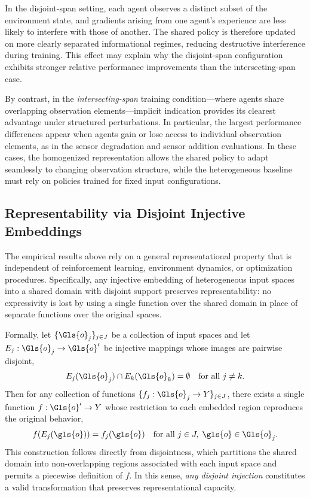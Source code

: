 In the disjoint-span setting, each agent observes a distinct subset of the
environment state, and gradients arising from one agent's experience are less
likely to interfere with those of another. The shared policy is therefore
updated on more clearly separated informational regimes, reducing destructive
interference during training. This effect may explain why the disjoint-span
configuration exhibits stronger relative performance improvements than the
intersecting-span case.

By contrast, in the \emph{intersecting-span} training condition—where agents share
overlapping observation elements—implicit indication provides its clearest advantage
under structured perturbations. In particular, the largest performance differences
appear when agents gain or lose access to individual observation elements, as in the
sensor degradation and sensor addition evaluations. In these cases, the homogenized
representation allows the shared policy to adapt seamlessly to changing observation
structure, while the heterogeneous baseline must rely on policies trained for fixed
input configurations.

\subsection{Representability via Disjoint Injective Embeddings}


The empirical results above rely on a general representational property that is
independent of reinforcement learning, environment dynamics, or optimization
procedures. Specifically, any injective embedding of heterogeneous input spaces
into a shared domain with disjoint support preserves representability: no
expressivity is lost by using a single function over the shared domain in place of
separate functions over the original spaces.

Formally, let \(\{\Gls{o}_j\}_{j \in J}\) be a collection of input spaces and let
\(E_j : \Gls{o}_j \rightarrow \Gls{o}'\) %
be injective mappings whose images are pairwise disjoint,
\[
    E_j(\Gls{o}_j) \cap E_k(\Gls{o}_k) = \emptyset \quad \text{for all } j \neq k.
\]
Then for any collection of functions
\(\{f_j : \Gls{o}_j \rightarrow Y\}_{j \in J}\),
there exists a single function \(f : \Gls{o}' \rightarrow Y\) 
whose restriction to each embedded region reproduces the original behavior,
\[
    f(E_j(\gls{o})) = f_j(\gls{o}) %
    \quad \text{for all } j \in J,\; \gls{o} \in \Gls{o}_j.
\]
This construction follows directly from disjointness, which partitions the shared
domain into non-overlapping regions associated with each input space and permits a
piecewise definition of \(f\). In this sense, \emph{any disjoint injection}
constitutes a valid transformation that preserves representational capacity.

